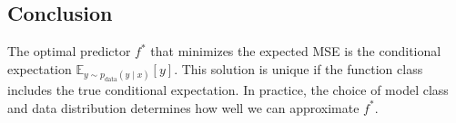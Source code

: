 \begin{notechapter}
\section{Conclusion}
The optimal predictor \( f^* \) that minimizes the expected MSE is the conditional expectation \( \mathbb{E}_{y \sim p_{\text{data}}(y \mid x)} [y] \). This solution is unique if the function class includes the true conditional expectation. In practice, the choice of model class and data distribution determines how well we can approximate \( f^* \).
\end{notechapter}
